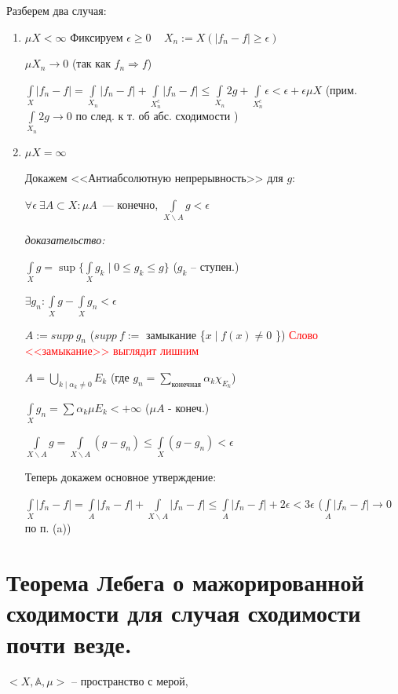 \documentclass[paper=a4, fontsize=17pt]{article}
\begin{document}
\begin{flushleft}
\begin{enumerate}
	Разберем два случая:
	\begin{enumerate}
		\item $ \mu X < \infty $
		Фиксируем $ \epsilon \ge 0 $ ~ $ X_n := X(|f_n - f| \geq \epsilon) $

		$ \mu X_n \rightarrow 0 $ (так как $ f_n \Rightarrow f $)

		$ \int\limits_{X} |f_n - f| =
		\int\limits_{X_n} |f_n - f| + \int\limits_{X_n^c} |f_n - f| \leq
		\int\limits_{X_n} 2g + \int\limits_{X_n^c} \epsilon < \epsilon + \epsilon \mu X $ (прим. $ \int\limits_{X_n} 2g \rightarrow 0 $ по след. к т. об абс. сходимости )

		\item $ \mu X = \infty $

		Докажем <<Антиабсолютную непрерывность>> для $ g $:

		$ \forall \epsilon ~ \exists A \subset X: \mu A$~--- конечно,
		$ \int\limits_{X\backslash A} g < \epsilon $

		\textit{доказательство:}

		$ \int\limits_X g = \sup \{ \int\limits_{X} g_k \mid 0 \leq g_k \leq g \} $ ($ g_k $ -- ступен.)

		$ \exists g_n: \int\limits_{X} g - \int\limits_{X} g_n < \epsilon $

		$ A:= supp\ g_n $ ($ supp\ f := $ замыкание \{$ x \mid f(x) \neq 0$ \})
        \textcolor{red}{Слово <<замыкание>> выглядит лишним}

		$ A =  \bigcup\limits_{k \mid \alpha_k \neq 0} E_k $ (где $g_n=\sum\limits_{\text{конечная}} \alpha_k \chi_{E_k}$)

		$ \int\limits_{X} g_n  = \sum \alpha_k \mu E_k  < +\infty $ ($ \mu A $ - конеч.)

		$ \int\limits_{X\backslash A} g =
		\int\limits_{X\backslash A} (g - g_n) \leq
		\int\limits_{X} (g - g_n) < \epsilon $

		Теперь докажем основное утверждение:

		 $ \int\limits_{X} |f_n - f| =
		 \int\limits_{A} |f_n - f| + \int\limits_{X\backslash A} |f_n - f| \leq
		 \int\limits_{A} |f_n - f| + 2\epsilon < 3 \epsilon $
		 ($  \int\limits_{A} |f_n - f| \rightarrow 0$  по п. (a))
	\end{enumerate}
\end{enumerate}
\end{flushleft}
\section{Теорема Лебега о мажорированной сходимости для случая сходимости почти везде.}
$<X, \mathds{A}, \mu>$ -- пространство с мерой,
\end{document}
